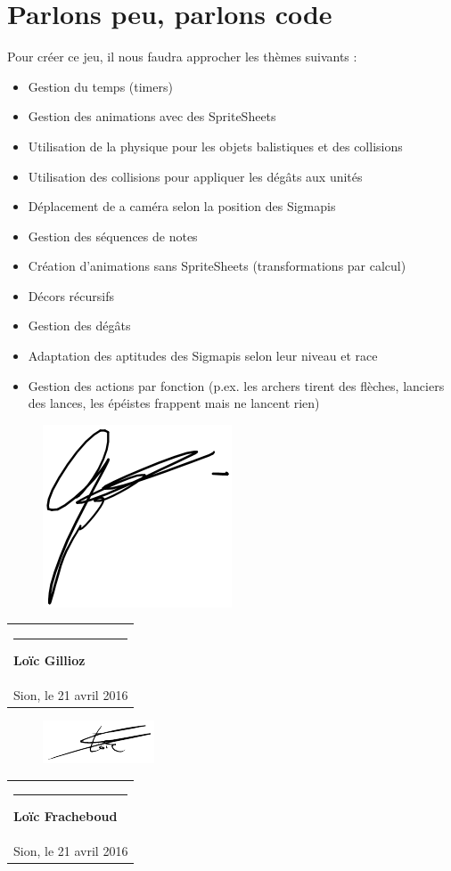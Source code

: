 \documentclass[a4paper , 10pt]{article}
\newcommand{\signature}[2]{%
 \par\nobreak\bigskip
 \begin{singlespace}%
 \mbox{}\hfill\begin{tabular}{p{8cm} }
     \rule{8cm}{0.5pt}\newline{}%
       \textbf{#1}\\%
      #2 %
 \end{tabular}%
 \end{singlespace}%
 \medskip%
}
\begin{document}
\section{Parlons peu, parlons code}
Pour créer ce jeu, il nous faudra approcher les thèmes suivants :
\begin{itemize}
\item Gestion du temps (timers)
\item Gestion des animations avec des SpriteSheets
\item Utilisation de la physique pour les objets balistiques et des collisions
\item Utilisation des collisions pour appliquer les dégâts aux unités
\item Déplacement de a caméra selon la position des Sigmapis
\item Gestion des séquences de notes 
\item Création d'animations sans SpriteSheets (transformations par calcul)
\item Décors récursifs
\item Gestion des dégâts
\item Adaptation des aptitudes des Sigmapis selon leur niveau et race
\item Gestion des actions par fonction (p.ex. les archers tirent des flèches, lanciers des lances, les épéistes frappent mais ne lancent rien)
\end{itemize}


\vspace{30pt}
\begin{figure}
\vspace{-52pt}
\centering
\includegraphics[scale=0.5]{signgillioz}
\end{figure}
\signature{Loïc Gillioz}{Sion, le 21 avril 2016} 

\begin{figure}
\vspace{-52pt}
\centering
\includegraphics[scale=1]{signfracheboud}
\end{figure}
\signature{Loïc Fracheboud}{Sion, le 21 avril 2016} 
\end{document}
